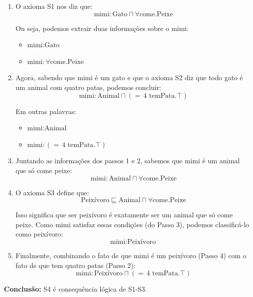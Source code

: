 \documentclass{article}
\begin{document}
\begin{enumerate}[leftmargin=*, itemsep=1em, label=\textbf{Passo \arabic*:}]
    \item O axioma S1 nos diz que:
    \[
        \text{mimi} : \text{Gato} \sqcap \forall \text{come}.\text{Peixe}
    \]
    
    Ou seja, podemos extrair duas informações sobre o mimi:
    \begin{itemize}[itemsep=0.3em]
        \item \(\text{mimi} : \text{Gato}\)
        \item \(\text{mimi} : \forall \text{come}.\text{Peixe}\)
    \end{itemize}
    
    \item Agora, sabendo que mimi é um gato e que o axioma S2 diz que todo gato é um animal com quatro patas, podemos concluir:
    \[
        \text{mimi} : \text{Animal} \sqcap ({=}\,4\text{ temPata}.\top)
    \]
    
    Em outras palavras:
    \begin{itemize}[itemsep=0.3em]
        \item \(\text{mimi} : \text{Animal}\)
        \item \(\text{mimi} : ({=}\,4\text{ temPata}.\top)\)
    \end{itemize}
    
    \item Juntando as informações dos passos 1 e 2, sabemos que mimi é um animal que só come peixe:
    \[
        \text{mimi} : \text{Animal} \sqcap \forall \text{come}.\text{Peixe}
    \]
    
    \item O axioma S3 define que:
    \[
        \text{Peixívoro} \sqsubseteq \text{Animal} \sqcap \forall \text{come}.\text{Peixe}
    \]
    
    Isso significa que ser peixívoro é exatamente ser um animal que só come peixe. Como mimi satisfaz essas condições (do Passo 3), podemos classificá-lo como peixívoro:
    \[
        \text{mimi} : \text{Peixívoro}
    \]
    
    \item Finalmente, combinando o fato de que mimi é um peixívoro (Passo 4) com o fato de que tem quatro patas (Passo 2):
    \[
        \text{mimi} : \text{Peixívoro} \sqcap ({=}\,4\text{ temPata}.\top)
    \]
\end{enumerate}

\vspace{1em}

\noindent\textbf{Conclusão:} S4 é consequência lógica de S1-S3.
\end{document}
